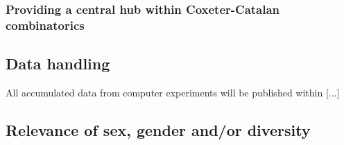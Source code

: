 \documentclass[a4paper,11pt]{article} %
\begin{document}
\subsubsection{Providing a central hub within Coxeter-Catalan combinatorics}
\label{sec:centralhub}


\subsection{Data handling}

All accumulated data from computer experiments will be published within [...]


\subsection{Relevance of sex, gender and/or diversity}
\end{document}
